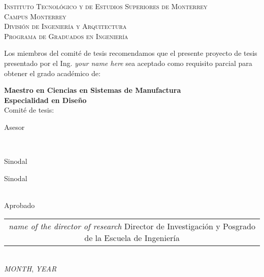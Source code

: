 \thispagestyle{empty}
\begin{center}
  {\large \textsc{Instituto Tecnol\'ogico y de Estudios Superiores de Monterrey\\
                  Campus Monterrey}}\\[3mm]
  \textsc{Divisi\'on de Ingenier\'{i}a y Arquitectura}\\
  \textsc{Programa de Graduados en Ingenier\'{i}a}\\[5mm]
\end{center}
 
 \normalsize
  Los miembros del comit\'e de tesis recomendamos que el presente
  proyecto de tesis presentado por el Ing. \emph{your name here} 
  sea aceptado como requisito parcial para obtener el grado acad\'{e}mico 
  de:\\ 
\begin{center}
   \textbf{Maestro en Ciencias en Sistemas de Manufactura\\
           Especialidad en Dise\~no}\\[5mm]
 
Comit\'e de tesis:\\
\vspace*{2em}
\begin{minipage}[t]{6.5 cm}
  \begin{center}
     {\footnotesize Asesor}
  \end{center}
\end{minipage}\\%
\vspace*{3em}
\begin{minipage}[t]{6.5 cm}
  \begin{center}
     {\footnotesize Sinodal}
  \end{center}
\end{minipage}
\hfill
\begin{minipage}[t]{6.5 cm}
   \begin{center}
      {\footnotesize Sinodal}
    \end{center}
\end{minipage} \\[5mm]
Aprobado\\[20mm]
  \begin{tabular}[htbp]{c}
    \hline
    \emph{name of the director of research}
    {\footnotesize Director de Investigaci\'on y Posgrado de la Escuela de Ingenier\'ia}
  \end{tabular}\\
\emph{MONTH}, \emph{YEAR} 
\end{center}

